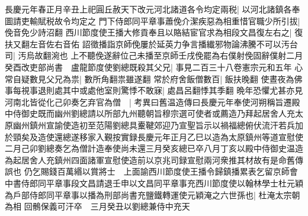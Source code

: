 長慶元年春正月辛丑上祀圓丘赦天下改元河北諸道各令均定兩税|{
	以河北諸鎮各奉圖請吏輸賦税故令均定之}
門下侍郎同平章事蕭俛介潔疾惡為相重惜官職少所引拔|{
	俛音免少詩沼翻}
西川節度使王播大修貢奉且以賂結宦官求為相段文昌復左右之|{
	復扶又翻左音佐右音佑}
詔徵播詣京師俛屢於延英力争言播纎邪物論沸騰不可以汚台司|{
	汚烏故翻涴也}
上不聽俛遂辭位己未播至京師壬戌俛罷為右僕射俛固辭僕射二月癸酉改吏部尚書　盧龍節度使劉總既殺其父兄|{
	事見二百三十八卷憲宗元和五年}
心常自疑數見父兄為祟|{
	數所角翻祟雖遂翻}
常於府舍飯僧數百|{
	飯扶晚翻}
使晝夜為佛事每視事退則處其中或處他室則驚悸不敢寐|{
	處昌呂翻悸其季翻}
晩年恐懼尤甚亦見河南北皆從化己卯奏乞弃官為僧　|{
	考異曰舊温造傳曰長慶元年奉使河朔稱旨遷殿中侍御史既而幽州劉總請以所部九州聽朝旨穆宗選可使者或薦造乃拜起居舍人充太原幽州鎮州宣諭使造初至范陽劉總具櫜鞬郊迎乃宣聖旨示以禍福總俯伏流汗若兵加於頸矣及造使還總遂移家入覲按實録長慶元年正月乙巳以造為太原鎮州等道宣慰使二月己卯劉總奏乞為僧計造奉使尚未還三月癸亥總已卒八月丁亥以殿中侍御史温造為起居舍人充鎮州四面諸軍宣慰使造前以京兆司録宣慰兩河衆推其材故有是命舊傳誤也}
仍乞賜錢百萬緡以賞將士　上面諭西川節度使王播令歸鎮播累表乞留京師會中書侍郎同平章事段文昌請退壬申以文昌同平章事充西川節度使以翰林學士杜元穎為戶部侍郎同平章事以播為刑部尚書充鹽鐵轉運使元穎淹之六世孫也|{
	杜淹太宗朝為相}
回鶻保義可汗卒　三月癸丑以劉總兼侍中充天


